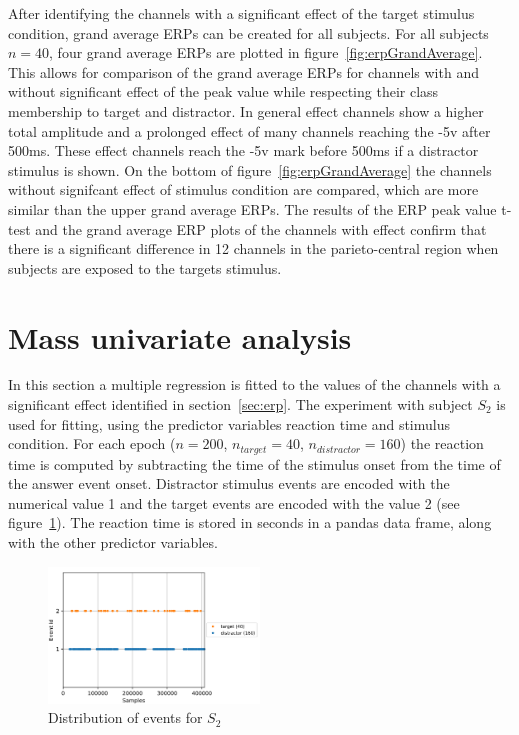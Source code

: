 \documentclass[a4paper]{article}
\begin{document}
After identifying the channels with a significant effect of the target stimulus condition, grand average ERPs can be created for all subjects.
For all subjects $n=40$, four grand average ERPs are plotted in figure~\ref{fig:erpGrandAverage}.
This allows for comparison of the grand average ERPs for channels with and without significant effect of the peak value while respecting their class membership to target and distractor.
In general effect channels show a higher total amplitude and a prolonged effect of many channels reaching the -5\textmu v after 500ms.
These effect channels reach the -5\textmu v mark before 500ms if a distractor stimulus is shown.
On the bottom of figure~\ref{fig:erpGrandAverage} the channels without signifcant effect of stimulus condition are compared,  which are more similar than the upper grand average ERPs.
The results of the ERP peak value t-test and the grand average ERP plots of the channels with effect confirm that there is a significant difference in 12 channels in the parieto-central region when subjects are exposed to the targets stimulus.

\section{Mass univariate analysis}
\label{sec:massuni}
In this section a multiple regression is fitted to the values of the channels with a significant effect identified in section~\ref{sec:erp}.
The experiment with subject $S_2$ is used for fitting, using the predictor variables reaction time and stimulus condition.
For each epoch ($n=200$, $n_{target}=40$, $n_{distractor}=160$) the reaction time is computed by subtracting the time of the stimulus onset from the time of the answer event onset.
Distractor stimulus events are encoded with the numerical value 1 and the target events are encoded with the value 2 (see figure~\ref{fig:mrEvents}).
The reaction time is stored in seconds in a pandas data frame, along with the other predictor variables.

\begin{figure}[tbh!] 
  \centering
     \includegraphics[width=0.5\textwidth]{mrEvents.png}
  \caption{Distribution of events for $S_2$}
  \label{fig:mrEvents}
\end{figure}
\end{document}
